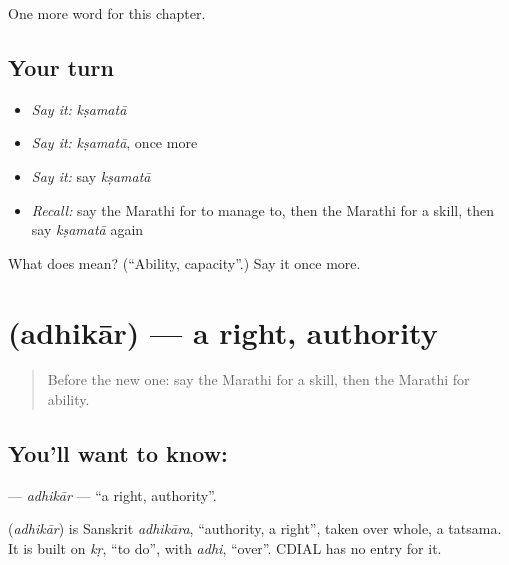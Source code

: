 \begin{grammarlens}[title={What you've built}]
One more word for this chapter.
\end{grammarlens}

\subsection*{Your turn}
\begin{itemize}
\raggedright
  \item \emph{Say it:} \emph{kṣamatā}
  \item \emph{Say it:} \emph{kṣamatā}, once more
  \item \emph{Say it:} say \emph{kṣamatā}
  \item \emph{Recall:} say the Marathi for to manage to, then the Marathi for a skill, then say \emph{kṣamatā} again
\end{itemize}

\begin{tcolorbox}[breakable,colback=teal!4,colframe=teal!35!black,title={Before you move on}]
What does  mean? (\textquotedblleft{}Ability, capacity\textquotedblright{}.) Say it once more.
\end{tcolorbox}
\section[\texorpdfstring{\mr{अधिकार} (adhikār)}{अधिकार (adhikār)}]{ (adhikār) — a right, authority}

\label{lesson:MR-C121-adhikar}



\begin{quote}
Before the new one: say the Marathi for a skill, then the Marathi for ability.
\end{quote}

\subsection*{You'll want to know: }
\textbf{} — \emph{adhikār} — \textquotedblleft{}a right, authority\textquotedblright{}.

\begin{cousinweb}
\textbf{} (\emph{adhikār}) is Sanskrit \emph{adhikāra}, \textquotedblleft{}authority, a right\textquotedblright{}, taken over whole, a tatsama. It is built on \emph{kṛ}, \textquotedblleft{}to do\textquotedblright{}, with \emph{adhi}, \textquotedblleft{}over\textquotedblright{}. CDIAL has no entry for it.
\end{cousinweb}

